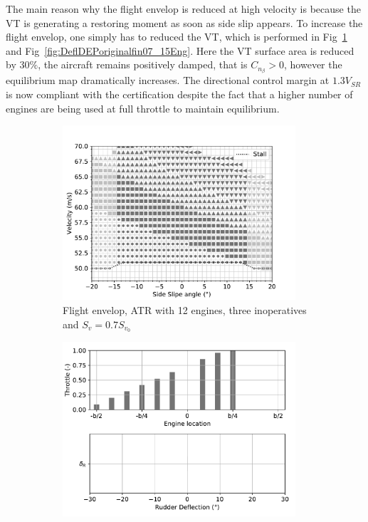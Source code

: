 The main reason why the flight envelop is reduced at high velocity is because the VT is generating a restoring moment as soon as side slip appears. To increase the flight envelop, one simply has to reduced the VT, which is performed in Fig~\ref{fig:DEPoriginalfin07_15engine} and Fig~\ref{fig:DeflDEPoriginalfin07_15Eng}. Here the VT surface area is reduced by $30\%$, the aircraft remains positively damped, that is $C_{n_\beta}>0$, however the equilibrium map dramatically increases. The directional control margin at $1.3V_{SR}$ is now compliant with the certification despite the fact that a higher number of engines are being used at full throttle to maintain equilibrium.


\begin{figure}[hbt!]
	\centering
	\begin{subfigure}{0.49\textwidth}
		\includegraphics[width=0.95\textwidth]{DEPoriginalMapBetaVelfin07Eng15RudTrue}
		\caption{Flight envelop, ATR with 12 engines, three inoperatives and $S_v=0.7S_{v_0}$}
		\label{fig:DEPoriginalfin07_15engine}
	\end{subfigure}
	\begin{subfigure}{0.49\textwidth}
		\includegraphics[width=0.95\textwidth]{DeflDEPoriginalfin07Eng15RudTrue}

\end{subfigure}
\end{figure}
